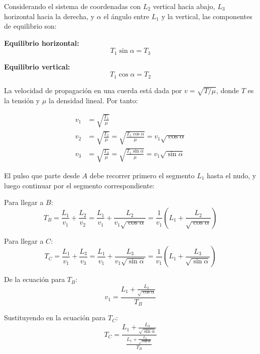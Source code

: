 \documentclass[
  11pt,
  letterpaper,
   addpoints,
   answers
  ]{exam}
\begin{document}
\begin{questions}
\begin{solution}
Considerando el sistema de coordenadas con $L_2$ vertical hacia abajo, $L_3$ horizontal hacia la derecha, y $\alpha$ el ángulo entre $L_1$ y la vertical, las componentes de equilibrio son:

\textbf{Equilibrio horizontal:}
\begin{equation}
T_1 \sin\alpha = T_3
\end{equation}

\textbf{Equilibrio vertical:}
\begin{equation}
T_1 \cos\alpha = T_2
\end{equation}

La velocidad de propagación en una cuerda está dada por $v = \sqrt{T/\mu}$, donde $T$ es la tensión y $\mu$ la densidad lineal. Por tanto:

\begin{align}
v_1 &= \sqrt{\frac{T_1}{\mu}} \\
v_2 &= \sqrt{\frac{T_2}{\mu}} = \sqrt{\frac{T_1 \cos\alpha}{\mu}} = v_1\sqrt{\cos\alpha} \\
v_3 &= \sqrt{\frac{T_3}{\mu}} = \sqrt{\frac{T_1 \sin\alpha}{\mu}} = v_1\sqrt{\sin\alpha}
\end{align}

El pulso que parte desde $A$ debe recorrer primero el segmento $L_1$ hasta el nudo, y luego continuar por el segmento correspondiente:

Para llegar a $B$:
\begin{equation}
T_B = \frac{L_1}{v_1} + \frac{L_2}{v_2} = \frac{L_1}{v_1} + \frac{L_2}{v_1\sqrt{\cos\alpha}} = \frac{1}{v_1}\left(L_1 + \frac{L_2}{\sqrt{\cos\alpha}}\right)
\end{equation}

Para llegar a $C$:
\begin{equation}
T_C = \frac{L_1}{v_1} + \frac{L_3}{v_3} = \frac{L_1}{v_1} + \frac{L_3}{v_1\sqrt{\sin\alpha}} = \frac{1}{v_1}\left(L_1 + \frac{L_3}{\sqrt{\sin\alpha}}\right)
\end{equation}

De la ecuación para $T_B$:
\begin{equation}
v_1 = \frac{L_1 + \frac{L_2}{\sqrt{\cos\alpha}}}{T_B}
\end{equation}

Sustituyendo en la ecuación para $T_C$:
\begin{equation}
T_C = \frac{L_1 + \frac{L_3}{\sqrt{\sin\alpha}}}{\frac{L_1 + \frac{L_2}{\sqrt{\cos\alpha}}}{T_B}}
\end{equation}


\end{solution}
\end{questions}
\end{document}
